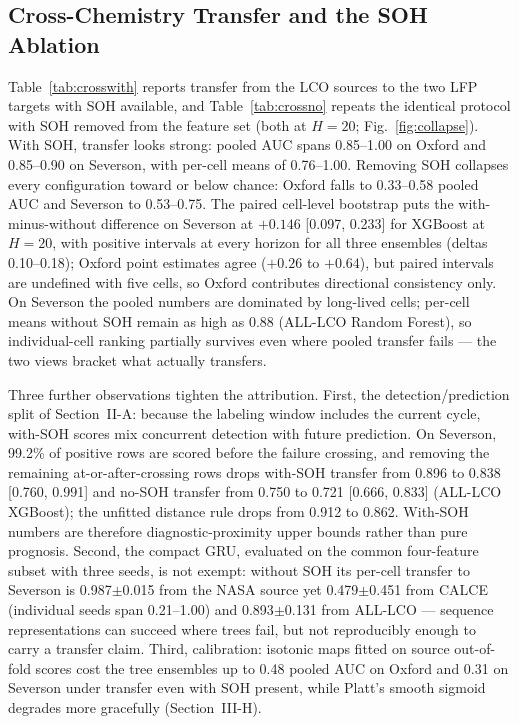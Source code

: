 \documentclass[11pt,a4paper]{article}
\begin{document}
\subsection{Cross-Chemistry Transfer and the SOH Ablation}
Table~\ref{tab:crosswith} reports transfer from the LCO sources to the two LFP targets with SOH available, and Table~\ref{tab:crossno} repeats the identical protocol with SOH removed from the feature set (both at $H{=}20$; Fig.~\ref{fig:collapse}). With SOH, transfer looks strong: pooled AUC spans 0.85--1.00 on Oxford and 0.85--0.90 on Severson, with per-cell means of 0.76--1.00. Removing SOH collapses every configuration toward or below chance: Oxford falls to 0.33--0.58 pooled AUC and Severson to 0.53--0.75. The paired cell-level bootstrap puts the with-minus-without difference on Severson at $+0.146$ [0.097, 0.233] for XGBoost at $H{=}20$, with positive intervals at every horizon for all three ensembles (deltas 0.10--0.18); Oxford point estimates agree ($+0.26$ to $+0.64$), but paired intervals are undefined with five cells, so Oxford contributes directional consistency only. On Severson the pooled numbers are dominated by long-lived cells; per-cell means without SOH remain as high as 0.88 (ALL-LCO Random Forest), so individual-cell ranking partially survives even where pooled transfer fails --- the two views bracket what actually transfers.

Three further observations tighten the attribution. First, the detection/prediction split of Section~II-A: because the labeling window includes the current cycle, with-SOH scores mix concurrent detection with future prediction. On Severson, 99.2\% of positive rows are scored before the failure crossing, and removing the remaining at-or-after-crossing rows drops with-SOH transfer from 0.896 to 0.838 [0.760, 0.991] and no-SOH transfer from 0.750 to 0.721 [0.666, 0.833] (ALL-LCO XGBoost); the unfitted distance rule drops from 0.912 to 0.862. With-SOH numbers are therefore diagnostic-proximity upper bounds rather than pure prognosis. Second, the compact GRU, evaluated on the common four-feature subset with three seeds, is not exempt: without SOH its per-cell transfer to Severson is 0.987$\pm$0.015 from the NASA source yet 0.479$\pm$0.451 from CALCE (individual seeds span 0.21--1.00) and 0.893$\pm$0.131 from ALL-LCO --- sequence representations can succeed where trees fail, but not reproducibly enough to carry a transfer claim. Third, calibration: isotonic maps fitted on source out-of-fold scores cost the tree ensembles up to 0.48 pooled AUC on Oxford and 0.31 on Severson under transfer even with SOH present, while Platt's smooth sigmoid degrades more gracefully (Section~III-H).
\end{document}
